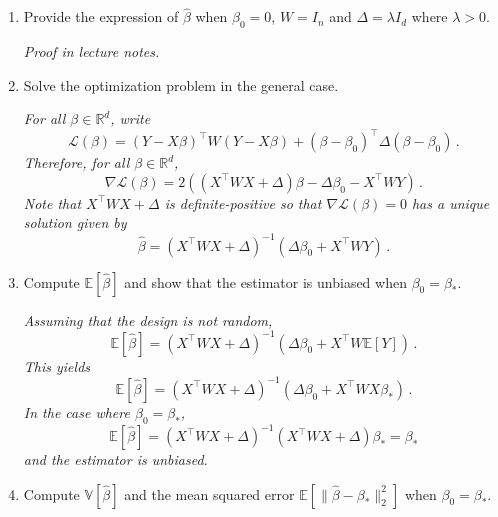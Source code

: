 \documentclass[a4paper,10pt,fleqn]{article}
\newcommand{\eqsp}{\,}
\newcommand{\rset}{\ensuremath{\mathbb{R}}}
\newcommand{\1}{\ensuremath{\mathbbm{1}}}
\begin{document}
\begin{enumerate}
\item Provide the expression of $\widehat \beta$ when $\beta_0 = 0$, $W = I_n$ and $\Delta = \lambda I_d$ where $\lambda>0$.

\vspace{.2cm}

{\em
Proof in lecture notes.
} 
\item Solve the optimization problem in the general case.
\vspace{.2cm}

{\em
For all $\beta\in\rset^d$, write
$$
\mathcal{L}(\beta) = (Y -X\beta)^\top W (Y-X\beta) + (\beta-\beta_0)^\top \Delta (\beta-\beta_0)\eqsp.
$$
Therefore, for all $\beta\in\rset^d$,
$$
\nabla \mathcal{L}(\beta)  = 2\left( \left(X^\top W X + \Delta\right)\beta - \Delta\beta_0 - X^\top W Y\right)\eqsp.
$$
Note that $X^\top W X + \Delta$ is definite-positive so that $\nabla \mathcal{L}(\beta)=0$ has a unique solution given by
$$
\widehat{\beta} = \left(X^\top W X + \Delta\right)^{-1}(\Delta\beta_0 + X^\top W Y)\eqsp.
$$
}
\item Compute $\mathbb{E}[\widehat \beta]$ and show that the estimator is unbiased when $\beta_0 = \beta_*$.
\vspace{.2cm}

{\em
Assuming that the design is not random, 
$$
\mathbb{E}[\widehat \beta] =  \left(X^\top W X + \Delta\right)^{-1}(\Delta\beta_0 + X^\top W \mathbb{E}[Y])\eqsp.
$$
This yields
$$
\mathbb{E}[\widehat \beta] =  \left(X^\top W X + \Delta\right)^{-1}(\Delta\beta_0 + X^\top W X\beta_*)\eqsp.
$$
In the case where $\beta_0 = \beta_*$,
$$
\mathbb{E}[\widehat \beta] =  \left(X^\top W X + \Delta\right)^{-1}\left(X^\top W X + \Delta\right)\beta_* = \beta_*
$$
and the estimator is unbiased.
}
\item Compute $\mathbb{V}[\widehat \beta]$ and the mean squared error $\mathbb{E}[\|\widehat \beta-\beta_*\|_2^2]$ when $\beta_0 = \beta_*$.
\vspace{.2cm}


\end{enumerate}
\end{document}
